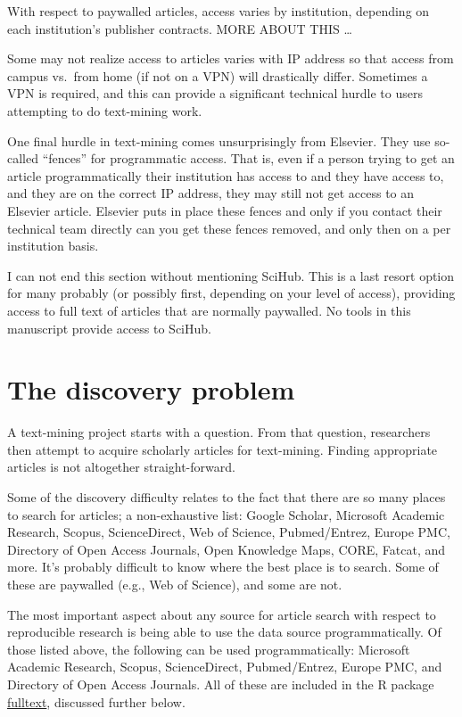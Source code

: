 \documentclass[author-year, review, 11pt]{components/elsarticle} %
\begin{document}
With respect to paywalled articles, access varies by institution,
depending on each institution's publisher contracts. MORE ABOUT THIS
\ldots{}

Some may not realize access to articles varies with IP address so that
access from campus vs.~from home (if not on a VPN) will drastically
differ. Sometimes a VPN is required, and this can provide a significant
technical hurdle to users attempting to do text-mining work.

One final hurdle in text-mining comes unsurprisingly from Elsevier. They
use so-called ``fences'' for programmatic access. That is, even if a
person trying to get an article programmatically their institution has
access to and they have access to, and they are on the correct IP
address, they may still not get access to an Elsevier article. Elsevier
puts in place these fences and only if you contact their technical team
directly can you get these fences removed, and only then on a per
institution basis.

I can not end this section without mentioning SciHub. This is a last
resort option for many probably (or possibly first, depending on your
level of access), providing access to full text of articles that are
normally paywalled. No tools in this manuscript provide access to
SciHub.

\hypertarget{the-discovery-problem}{%
\section{The discovery problem}\label{the-discovery-problem}}

A text-mining project starts with a question. From that question,
researchers then attempt to acquire scholarly articles for text-mining.
Finding appropriate articles is not altogether straight-forward.

Some of the discovery difficulty relates to the fact that there are so
many places to search for articles; a non-exhaustive list: Google
Scholar, Microsoft Academic Research, Scopus, ScienceDirect, Web of
Science, Pubmed/Entrez, Europe PMC, Directory of Open Access Journals,
Open Knowledge Maps, CORE, Fatcat, and more. It's probably difficult to
know where the best place is to search. Some of these are paywalled
(e.g., Web of Science), and some are not.

The most important aspect about any source for article search with
respect to reproducible research is being able to use the data source
programmatically. Of those listed above, the following can be used
programmatically: Microsoft Academic Research, Scopus, ScienceDirect,
Pubmed/Entrez, Europe PMC, and Directory of Open Access Journals. All of
these are included in the R package
\href{https://github.com/ropensci/fulltext}{fulltext}, discussed further
below.
\end{document}
